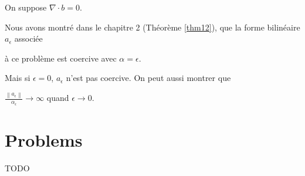 On suppose $\nabla \cdot b=0$. 

Nous avons montré dans le chapitre 2 (Théorème \ref{thm12}), que la forme bilinéaire $a_\epsilon$ associée 

à ce problème est coercive avec $\alpha=\epsilon$.  

Mais si $\epsilon =0$, $a_\epsilon$ n'est pas coercive.  On peut aussi montrer que 

$\frac{\left\|a_{\epsilon}\right\|}{\alpha_{\epsilon}}\longrightarrow \infty$ quand  $\epsilon\rightarrow 0$. 










\section{Problems}

\begin{exercise}
  TODO
\end{exercise}


